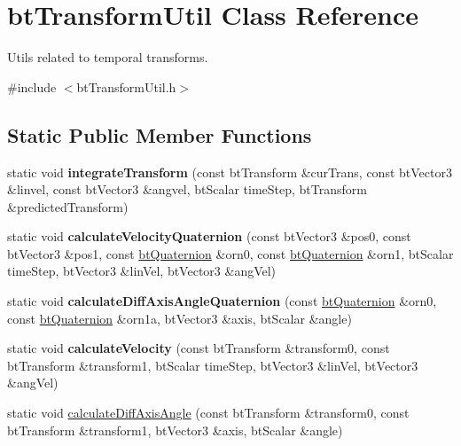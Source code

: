 \hypertarget{classbt_transform_util}{\section{bt\+Transform\+Util Class Reference}
\label{classbt_transform_util}
}


Utils related to temporal transforms.  




{\ttfamily \#include $<$bt\+Transform\+Util.\+h$>$}

\subsection*{Static Public Member Functions}
\begin{DoxyCompactItemize}
\item 
\hypertarget{classbt_transform_util_ac943ee956ab17687013a60a5918b23e4}{static void {\bfseries integrate\+Transform} (const bt\+Transform \&cur\+Trans, const bt\+Vector3 \&linvel, const bt\+Vector3 \&angvel, bt\+Scalar time\+Step, bt\+Transform \&predicted\+Transform)}\label{classbt_transform_util_ac943ee956ab17687013a60a5918b23e4}

\item 
\hypertarget{classbt_transform_util_a291f6db1cc528595ad710ab8f256b98a}{static void {\bfseries calculate\+Velocity\+Quaternion} (const bt\+Vector3 \&pos0, const bt\+Vector3 \&pos1, const \hyperlink{classbt_quaternion}{bt\+Quaternion} \&orn0, const \hyperlink{classbt_quaternion}{bt\+Quaternion} \&orn1, bt\+Scalar time\+Step, bt\+Vector3 \&lin\+Vel, bt\+Vector3 \&ang\+Vel)}\label{classbt_transform_util_a291f6db1cc528595ad710ab8f256b98a}

\item 
\hypertarget{classbt_transform_util_a11daea5e8931d47ceaf56aee74dadf96}{static void {\bfseries calculate\+Diff\+Axis\+Angle\+Quaternion} (const \hyperlink{classbt_quaternion}{bt\+Quaternion} \&orn0, const \hyperlink{classbt_quaternion}{bt\+Quaternion} \&orn1a, bt\+Vector3 \&axis, bt\+Scalar \&angle)}\label{classbt_transform_util_a11daea5e8931d47ceaf56aee74dadf96}

\item 
\hypertarget{classbt_transform_util_adea3509ccb6eb65675a102c80aa1b312}{static void {\bfseries calculate\+Velocity} (const bt\+Transform \&transform0, const bt\+Transform \&transform1, bt\+Scalar time\+Step, bt\+Vector3 \&lin\+Vel, bt\+Vector3 \&ang\+Vel)}\label{classbt_transform_util_adea3509ccb6eb65675a102c80aa1b312}

\item 
static void \hyperlink{classbt_transform_util_a39f53b05940a57082053067bd5e337ec}{calculate\+Diff\+Axis\+Angle} (const bt\+Transform \&transform0, const bt\+Transform \&transform1, bt\+Vector3 \&axis, bt\+Scalar \&angle)
\end{DoxyCompactItemize}


